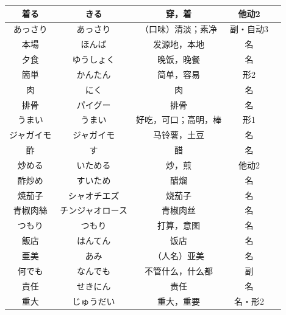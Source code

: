 \begin{longtable}{|c|c|c|c|c|}
着る & きる & 穿，着 & 他动2 & \\ \hline
あっさり & あっさり & （口味）清淡；素净 & 副・自动3 & \\ \hline
本場 & ほんば & 发源地，本地 & 名 & \\ \hline
夕食 & ゆうしょく & 晚饭，晚餐 & 名 & \\ \hline
簡単 & かんたん & 简单，容易 & 形2 & \\ \hline
肉 & にく & 肉 & 名 & \\ \hline
排骨 & パイグー & 排骨 & 名 & \\ \hline
うまい & うまい & 好吃，可口；高明，棒 & 形1 & \\ \hline
ジャガイモ & ジャガイモ & 马铃薯，土豆 & 名 & \\ \hline
酢 & す & 醋 & 名 & \\ \hline
炒める & いためる & 炒，煎 & 他动2 & \\ \hline
酢炒め & すいため & 醋熘 & 名 & \\ \hline
焼茄子 & シャオチエズ & 烧茄子 & 名 & \\ \hline
青椒肉絲 & チンジャオロース & 青椒肉丝 & 名 & \\ \hline
つもり & つもり & 打算，意图 & 名 & \\ \hline
飯店 & はんてん & 饭店 & 名 & \\ \hline
亜美 & あみ & （人名）亚美 & 名 & \\ \hline
何でも & なんでも & 不管什么，什么都 & 副 & \\ \hline
責任 & せきにん & 责任 & 名 & \\ \hline
重大 & じゅうだい & 重大，重要 & 名・形2 & \\ \hline
\end{longtable}

